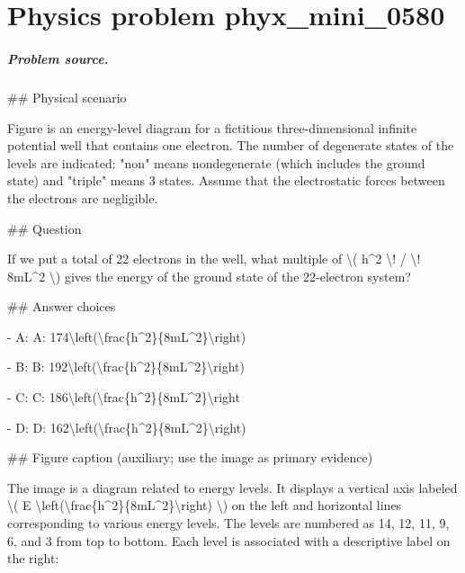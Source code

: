 
\chapter{Physics problem phyx\_mini\_0580}
\label{ch:PhyXMiniProblems_problem_phyx_mini_0580}

\paragraph{Problem source.}
\#\# Physical scenario

Figure is an energy-level diagram for a fictitious three-dimensional infinite potential well that contains one electron. The number of degenerate states of the levels are indicated: "non" means nondegenerate (which includes the ground state) and "triple" means 3 states. Assume that the electrostatic forces between the electrons are negligible.

\#\# Question

If we put a total of 22 electrons in the well, what multiple of \textbackslash{}( h\textasciicircum{}2 \textbackslash{}! / \textbackslash{}! 8mL\textasciicircum{}2 \textbackslash{}) gives the energy of the ground state of the 22-electron system?

\#\# Answer choices

- A: A: 174\textbackslash{}left(\textbackslash{}frac\{h\textasciicircum{}2\}\{8mL\textasciicircum{}2\}\textbackslash{}right)

- B: B: 192\textbackslash{}left(\textbackslash{}frac\{h\textasciicircum{}2\}\{8mL\textasciicircum{}2\}\textbackslash{}right)

- C: C: 186\textbackslash{}left(\textbackslash{}frac\{h\textasciicircum{}2\}\{8mL\textasciicircum{}2\}\textbackslash{}right

- D: D: 162\textbackslash{}left(\textbackslash{}frac\{h\textasciicircum{}2\}\{8mL\textasciicircum{}2\}\textbackslash{}right)

\#\# Figure caption (auxiliary; use the image as primary evidence)

The image is a diagram related to energy levels. It displays a vertical axis labeled \textbackslash{}( E \textbackslash{}left(\textbackslash{}frac\{h\textasciicircum{}2\}\{8mL\textasciicircum{}2\}\textbackslash{}right) \textbackslash{}) on the left and horizontal lines corresponding to various energy levels. The levels are numbered as 14, 12, 11, 9, 6, and 3 from top to bottom. Each level is associated with a descriptive label on the right:

